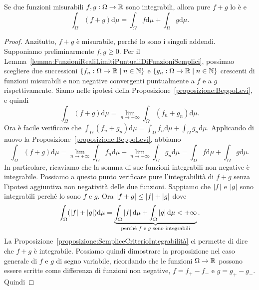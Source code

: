 \begin{corollario}
Se due funzioni misurabili \(f, g : \Omega \to \mathbb R\) sono integrabili, allora pure \(f+g\) lo è e
\[\int_\Omega (f+g) \mathrm d \mu = \int_\Omega f \mathrm d \mu + \int_\Omega g \mathrm d \mu .\]
\end{corollario}

\begin{proof}
Anzitutto, \(f+g\) è misurabile, perché lo sono i singoli addendi. Supponiamo preliminarmente \(f, g \ge 0\). Per il Lemma~\ref{lemma:FunzioniRealiLimitiPuntualiDiFunzioniSemplici}, possimao scegliere due successioni \(\left\{f_n : \Omega \to \mathbb R \mid n \in \mathbb N\right\}\) e \(\left\{g_n : \Omega \to \mathbb R \mid n \in \mathbb N\right\}\) crescenti di funzioni misurabili e non negative convergenti puntualmente a \(f\) e a \(g\) rispettivamente. Siamo nelle ipotesi della Proposizione~\ref{proposizione:BeppoLevi}, e quindi
\[\int_\Omega (f+g) \mathrm d \mu = \lim_{n \to +\infty} \int_\Omega (f_n + g_n) \mathrm d \mu .\]
Ora è facile verificare che \(\int_\Omega (f_n + g_n) \mathrm d \mu = \int_\Omega f_n \mathrm d \mu + \int_\Omega g_n \mathrm d \mu\). Applicando di nuovo la Proposizione~\ref{proposizione:BeppoLevi}, abbiamo
\[\int_\Omega (f+g) \mathrm d \mu = \lim_{n \to +\infty} \int_\Omega f_n \mathrm d \mu + \lim_{n \to +\infty} \int_\Omega g_n \mathrm d \mu = \int_\Omega f \mathrm d \mu + \int_\Omega g \mathrm d \mu .\]
In particolare, ricaviamo che la somma di sue funzioni integrabili non negative è integrabile. Possiamo a questo punto verificare pure l'integrabilità di \(f+g\) senza l'ipotesi aggiuntiva non negatività delle due funzioni. Sappiamo che \(\left\lvert f\right\rvert\) e \(\left\lvert g\right\rvert\) sono integrabili perché lo sono \(f\) e \(g\). Ora \(\left\lvert f+g\right\rvert \le \left\lvert f\right\rvert + \left\lvert g\right\rvert\) dove
\[\int_\Omega (\left\lvert f\right\rvert + \left\lvert g\right\rvert) \mathrm d \mu = \underbrace{\int_\Omega \left\lvert f\right\rvert \mathrm d \mu + \int_\Omega \left\lvert g\right\rvert \mathrm d \mu < +\infty}_{\text{perché \(f\) e \(g\) sono integrabili}} .\]
La Proposizione~\ref{proposizione:SempliceCriterioIntegrabilità} ci permette di dire che \(f+g\) è integrabile.
Possiamo quindi dimostrare la proposizione nel caso generale di \(f\) e \(g\) di segno variabile, ricordando che le funzioni \(\Omega \to \mathbb R\) possono essere scritte come differenza di funzioni non negative, \(f = f_+ - f_-\) e \(g = g_+ - g_-\). Quindi

\end{proof}
